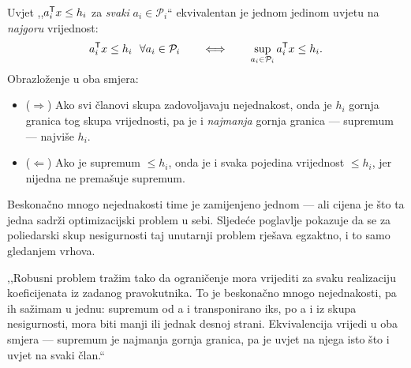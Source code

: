 \begin{korak}
Uvjet ,,$a_i^{\mathsf{T}} x \leq h_i$ za \emph{svaki} $a_i \in \mathcal{P}_i$``
ekvivalentan je jednom jedinom uvjetu na \emph{najgoru} vrijednost:
\begin{equation}
a_i^{\mathsf{T}} x \leq h_i \ \ \forall a_i \in \mathcal{P}_i
\qquad\Longleftrightarrow\qquad
\sup_{a_i \in \mathcal{P}_i} a_i^{\mathsf{T}} x \leq h_i .
\label{eq:z2-sup}
\end{equation}
Obrazloženje u oba smjera:
\begin{itemize}[nosep,leftmargin=*]
  \item ($\Rightarrow$) Ako svi članovi skupa zadovoljavaju nejednakost, onda je
        $h_i$ gornja granica tog skupa vrijednosti, pa je i \emph{najmanja}
        gornja granica --- supremum --- najviše $h_i$.
  \item ($\Leftarrow$) Ako je supremum $\leq h_i$, onda je i svaka pojedina
        vrijednost $\leq h_i$, jer nijedna ne premašuje supremum.
\end{itemize}
\end{korak}

Beskonačno mnogo nejednakosti time je zamijenjeno jednom --- ali cijena je što ta
jedna sadrži optimizacijski problem u sebi. Sljedeće poglavlje pokazuje da se za
poliedarski skup nesigurnosti taj unutarnji problem rješava egzaktno, i to samo
gledanjem vrhova.

\begin{izgovor}
,,Robusni problem tražim tako da ograničenje mora vrijediti za svaku realizaciju
koeficijenata iz zadanog pravokutnika. To je beskonačno mnogo nejednakosti, pa ih
sažimam u jednu: supremum od a i transponirano iks, po a i iz skupa nesigurnosti,
mora biti manji ili jednak desnoj strani. Ekvivalencija vrijedi u oba smjera ---
supremum je najmanja gornja granica, pa je uvjet na njega isto što i uvjet na
svaki član.``
\end{izgovor}
